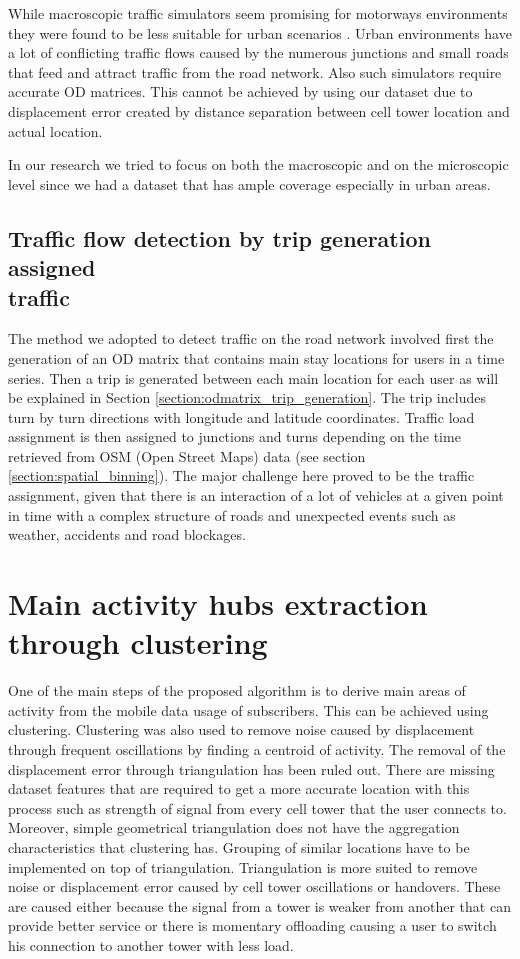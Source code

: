 \documentclass[12pt, a4paper]{report}
\theoremstyle{definition}
\theoremstyle{definition}%
\theoremstyle{definition}%
\theoremstyle{definition}%
\theoremstyle{definition}%
\theoremstyle{definition}%
\begin{document}
While macroscopic traffic simulators seem promising for motorways environments they were found to be less suitable for urban scenarios \cite{Bazghandi2012}. Urban environments have a lot of conflicting traffic flows caused by the numerous junctions and small roads that feed and attract traffic from the road network. Also such simulators require accurate OD matrices. This cannot be achieved by using our dataset due to displacement error created by distance separation between cell tower location and actual location.

In our research we tried to focus on both the macroscopic and on the microscopic level since we had a dataset that has ample coverage especially in urban areas.    


\subsection{Traffic flow detection by trip generation assigned\\ traffic} \label{subsection:methodology:trip_generation}
The method we adopted to detect traffic on the road network involved first the generation of an OD matrix that contains main stay locations for users in a time series. Then a trip is generated between each main location for each user as will be explained in Section \ref{section:odmatrix_trip_generation}. The trip includes turn by turn directions with longitude and latitude coordinates. Traffic load assignment is then assigned to junctions and turns depending on the time retrieved from OSM (Open Street Maps) data (see section \ref{section:spatial_binning}). The major challenge here proved to be the traffic assignment, given that there is an interaction of a lot of vehicles at a given point in time with a complex structure of roads and unexpected events such as weather, accidents and road blockages. 


\section{Main activity hubs extraction through clustering} \label{section:methodology:clustering}

One of the main steps of the proposed algorithm is to derive main areas of activity from the mobile data usage of subscribers. This can be achieved using clustering. Clustering was also used to remove noise caused by displacement through frequent oscillations by finding a centroid of activity. The removal of the displacement error through triangulation has been ruled out. There are missing dataset features that are required to get a more accurate location with this process such as strength of signal from every cell tower that the user connects to. Moreover, simple geometrical triangulation does not have the aggregation characteristics that clustering has. Grouping of similar locations have to be implemented on top of triangulation. Triangulation is more suited to remove noise or displacement error caused by cell tower oscillations or handovers. These are caused either because the signal from a tower is weaker from another that can provide better service or there is momentary offloading causing a user to switch his connection to another tower with less load. 
\end{document}
